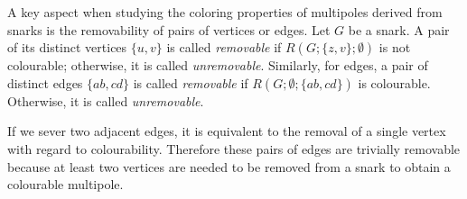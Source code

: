 A key aspect when studying the coloring properties of multipoles derived from snarks is the removability of pairs of vertices or edges.
	Let $G$ be a snark. A pair of its distinct vertices $\{u,v\}$ is called \textit{removable} if $R(G;\{z,v\};\emptyset)$ is not colourable; otherwise, it is called \textit{unremovable}. Similarly, for edges, a pair of distinct edges $\{ab,cd\}$ is called \textit{removable} if $R(G;\emptyset;\{ab,cd\})$ is colourable. Otherwise, it is called \textit{unremovable}.

If we sever two adjacent edges, it is equivalent to the removal of a single vertex with regard to colourability. Therefore these pairs of edges are trivially removable because at least two vertices are needed to be removed from a snark to obtain a colourable multipole.
